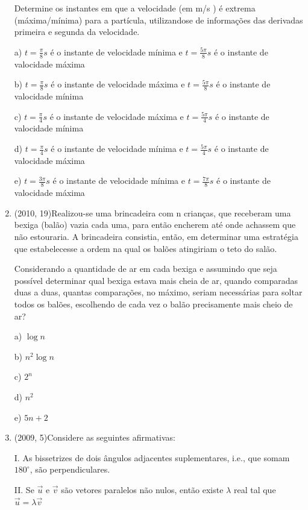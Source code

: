\documentclass{article}
\begin{document}
\begin{enumerate}
Determine os instantes em que a velocidade (em m/s ) é extrema (máxima/mínima) para a partícula, utilizandose de informações das derivadas primeira e segunda da velocidade.

a) $t=\frac{\pi}{8}s$ é o instante de velocidade mínima  e $t=\frac{5\pi }{8}s$ é o instante de valocidade máxima 

b) $t=\frac{\pi}{8}s$ é o instante de velocidade máxima  e $t=\frac{5\pi }{8}s$ é o instante de valocidade mínima 

c) $t=\frac{\pi}{4}s$ é o instante de velocidade máxima  e $t=\frac{5\pi }{4}s$ é o instante de valocidade mínima

d) $t=\frac{\pi}{4}s$ é o instante de velocidade mínima  e $t=\frac{5\pi }{4}s$ é o instante de valocidade máxima 

e) $t=\frac{3\pi}{8}s$ é o instante de velocidade mínima  e $t=\frac{7\pi }{8}s$ é o instante de valocidade máxima \newline





\item(2010, 19)Realizou-se uma brincadeira com n crianças, que receberam uma bexiga (balão) vazia cada uma, para então encherem até onde achassem que não estouraria. A brincadeira consistia, então, em determinar uma estratégia que estabelecesse a ordem na qual os balões atingiriam o teto do salão.

Considerando a quantidade de ar em cada bexiga e assumindo que seja possível determinar qual bexiga estava mais cheia de ar, quando comparadas duas a duas, quantas comparações, no máximo, seriam necessárias para soltar todos os balões, escolhendo de cada vez o balão precisamente mais cheio de ar?

a) $\log n$

b) $n^2 \log n$

c) $2^n$

d) $n^2$

e) $5n + 2$ \newline





\item(2009, 5)Considere as seguintes afirmativas:

I. As bissetrizes de dois ângulos adjacentes suplementares, i.e., que somam
$180^\circ$, são perpendiculares.

II. Se $\vec u$ e $\vec v$ são vetores paralelos não nulos, então existe $\lambda$ real tal que $\vec u = \lambda \vec v$


\end{enumerate}
\end{document}
